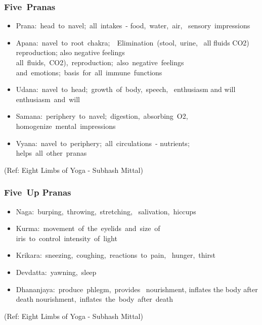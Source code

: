 \begin{frame}[fragile]\frametitle{Five Pranas }


	\begin{itemize}
	\item  Prana: head to navel; all intakes - food, water, air, 
sensory impressions
	\item Apana: navel to root chakra;  Elimination (stool, urine, 
all fluids CO2) reproduction; also negative feelings all fluids, CO2), reproduction; also negative feelings 
and emotions; basis for all immune functions
	\item Udana: navel to head; growth of body, speech, 
enthusiasm and will enthusiasm and will
	\item  Samana: periphery to navel; digestion, absorbing O2, 
homogenize mental impressions
	\item  Vyana: navel to periphery; all circulations - nutrients; 
helps all other pranas
	\end{itemize}

\tiny{(Ref: Eight Limbs of Yoga - Subhash Mittal)}

\end{frame}

\begin{frame}[fragile]\frametitle{Five Up Pranas }


	\begin{itemize}
	\item  Naga: burping, throwing, stretching, 
salivation, hiccups
	\item  Kurma: movement of the eyelids and size of 
iris to control intensity of light
	\item  Krikara: sneezing, coughing, reactions to pain, 
hunger, thirst
	\item  Devdatta: yawning, sleep
	\item  Dhananjaya: produce phlegm, provides 
nourishment, inflates the body after death nourishment, inflates the body after death
	\end{itemize}

\tiny{(Ref: Eight Limbs of Yoga - Subhash Mittal)}

\end{frame}

